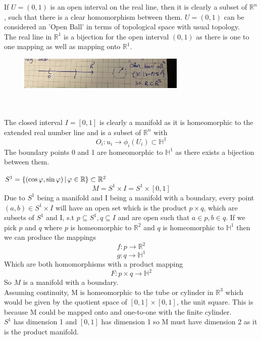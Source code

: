 \documentclass[12pt]{article}
\newcommand{\defset}[2]{ \left\{ #1 \left|\, #2\makebox[0pt]{$\displaystyle\phantom{#1}$}\right.\!\right\} }
\newcounter{alplisti}
\renewcommand{\thealplisti}{\alph{alplisti}}
\newenvironment{alplist}[1][(\thealplisti)]{\begin{list}{{\rm #1}\ }{ %
      \usecounter{alplisti} %
    \setlength{\itemsep}{0pt}
    \setlength{\parsep}{0pt}  %
     \setlength{\topsep}{0pt} %
}}{\end{list}}
\newcommand{\R} {\mathbb{R}}
\begin{document}
\begin{alplist}
 \item 
 If $U = (0,1)$ is an open interval on the real line, then it is clearly a subset of $\mathbb{R}^n$, such that there is a clear homomorphism between them. $U=(0,1)$ can be considered an 'Open Ball' in terms of topological space with usual topology.
 \\
 The real line in $\mathbb{R}^1$ is a bijection for the open interval $(0,1)$ as there is one to one mapping as well as mapping onto $\mathbb{R}^1$. 
 \begin{figure}[h]
   
  \includegraphics[width=8cm]{fig1.jpg}
  \centering
 \end{figure}
 \\
 \\
 The closed interval $I=[0,1]$ is clearly a manifold as it is homeomorphic to the extended real number line and is a subset of $\mathbb{R}^n$  with 
 $$ O_i: u_i \rightarrow \phi_i (U_i) \subset \mathbb{H}^1 $$
 The boundary points 0 and 1 are homeomorphic to $\mathbb{H}^1$ as there exists a bijection between them. 
 \item  $S^1=\defset{(\cos \varphi,\sin\varphi)}{\varphi\in \R}\subset \mathbb{R}^2$
 $$ M = S^1 \times I = S^1 \times [0,1] $$
Due to $S^1$ being a manifold and I being a manifold with a boundary, every point $(a,b) \in S^1 \times I$ will have an open set which is the product $p \times q$, which are subsets of $S^1$ and I, s.t $p \subseteq S^1, q \subseteq I$ and are open such that $a \in p, b \in q$. If we pick $p$ and $q$ where $p$ is homeomorphic to $\mathbb{R}^2$ and $q$ is homeomorphic to $\mathbb{H}^1$ then we can produce the mappings 
$$ f: p \rightarrow \mathbb{R}^2$$
$$ g: q \rightarrow \mathbb{H}^1$$
Which are both homomorphisms with a product mapping 
$$ F: p \times q \rightarrow \mathbb{H}^2$$ 
So $M$ is a manifold with a boundary. \\
Assuming continuity, M is homeomorphic to the tube or cylinder in $\mathbb{R}^3$ which would be given by the quotient space of $[0,1] \times [0,1]$, the unit square. This is because M could be mapped onto and one-to-one with the finite cylinder. 
\\
$S^1$ has dimension 1 and $[0,1]$ has dimension 1 so M must have dimension 2 as it is the product manifold. 

\end{alplist}
\end{document}
